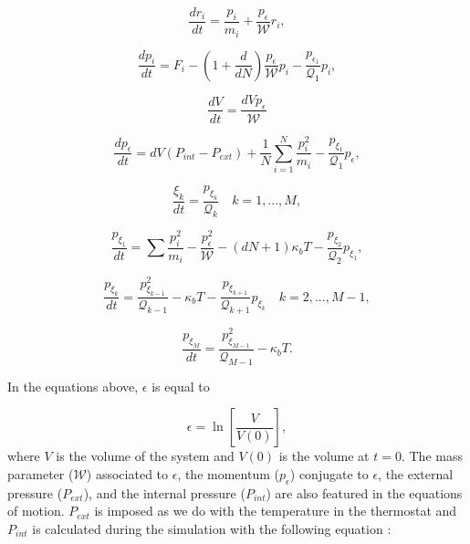 \begin{equation}
\frac{dr_{i}}{dt} = \frac{p_i}{m_i} + \frac{p_{\epsilon}}{\mathcal{W}} r_i,
\end{equation}

\begin{equation}
\frac{dp_{i}}{dt} = F_i  - \left(1 + \frac{d}{dN}\right) \frac{p_{\epsilon}}{\mathcal{W}} p_{i} - \frac{p_{\epsilon _{1}}}{\mathcal{Q} _1} p_{i},
\end{equation}

\begin{equation}
\frac{dV}{dt} = \frac{d V p_{\epsilon}}{\mathcal{W} }
\end{equation}

\begin{equation}
\frac{dp_{\epsilon}}{dt} = dV (    P_{int} -P_{ext}) + \frac{1}{N} \sum_{i=1}^{N} \frac{p_{i}^{2}}{m_i} - \frac{p_{\xi _{1}}}{{\mathcal{Q} _1}}p_{\epsilon},
\end{equation}

\begin{equation}
\frac{\xi _{k}}{dt} = \frac{p_{\xi _k}}{\mathcal{Q} _{k}} \quad k = 1,...,M ,
\end{equation}

\begin{equation}
\frac{p_{\xi _1}}{dt} = \sum \frac{p_{i}^{2}}{m_{i}} - \frac{p_{\epsilon}^{2}}{\mathcal{W}} -  (dN +1)\kappa_{b}T -\frac{p_{\xi _{2}}}{\mathcal{Q} _2}p_{\xi _{1}},
\end{equation}

\begin{equation}
\frac{p_{\xi _k}}{dt} = \frac{p_{\xi _{k -1}}^{2}}{\mathcal{Q} _{k-1}} - \kappa_{b}T - \frac{p_{\xi _{k+1}}}{\mathcal{Q} _{k+1}}p_{\xi _{k}} \quad k = 2,...,M-1 ,
\end{equation}

\begin{equation}
\frac{p_{\xi _M}}{dt} = \frac{ p_{\xi _{M-1}}^{2}}{\mathcal{Q} _{M-1}} - \kappa_{b}T .
\end{equation}

In the equations above, $\epsilon$ is equal to

\begin{equation}
\epsilon = \ln \left[\frac{V}{V(0)}\right],
\end{equation}
where $V$ is the volume of the system and $V(0)$ is the volume at $t=0$. The mass parameter ($\mathcal{W}$) associated to $\epsilon$, the momentum ($p_{\epsilon}$) conjugate to $\epsilon$, the external pressure ($P_{ext}$), and the internal pressure ($P_{int}$) are also featured in the equations of motion. $P_{ext}$ is imposed as we do with the temperature in the thermostat and $P_{int}$ is calculated during the simulation with the following equation \cite{tuckerman}:

